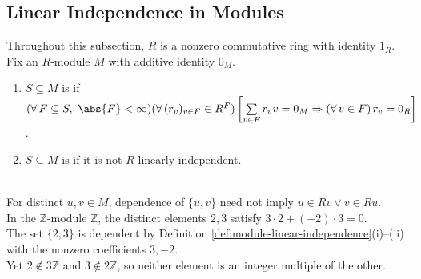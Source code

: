 \subsection{Linear Independence in Modules}

Throughout this subsection, $R$ is a nonzero commutative ring with identity $1_R$.\\
Fix an $R$-module $M$ with additive identity $0_M$.

\begin{definition} \label{def:module-linear-independence} 
\begin{enumerate}[label=(\roman*)]
\setlength{\itemsep}{0pt}
\item $S\subseteq M$ is  if $(\forall\,F\subseteq S,\ \abs{F}<\infty)(\forall\,(r_v)_{v\in F}\in R^F)\left[\sum\limits_{v\in F}r_vv=0_M\Rightarrow(\forall\,v\in F)\,r_v=0_R\right]$.
\item $S\subseteq M$ is  if it is not $R$-linearly independent.
\end{enumerate}
\end{definition}

\begin{counterexample} \label{cex:module-dependence-need-not-solve-for-vector} \\
For distinct $u,v\in M$, dependence of $\{u,v\}$ need not imply $u\in Rv\lor v\in Ru$.\\
In the $\mathbb{Z}$-module $\mathbb{Z}$, the distinct elements $2,3$ satisfy $3\cdot2+(-2)\cdot3=0$.\\
The set $\{2,3\}$ is dependent by Definition \ref{def:module-linear-independence}(i)--(ii) with the nonzero coefficients $3,-2$.\\
Yet $2\notin3\mathbb{Z}$ and $3\notin2\mathbb{Z}$, so neither element is an integer multiple of the other.
\end{counterexample}

